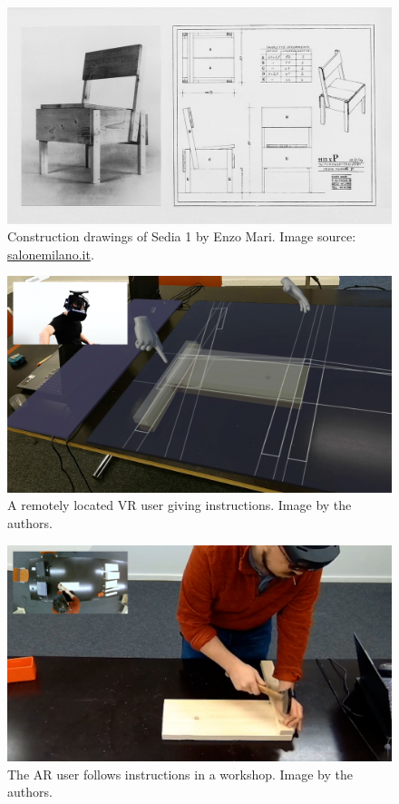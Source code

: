 \documentclass[10pt,twocolumn,letterpaper,english]{article}
\begin{document}
\begin{figure}[!htp]
    \centering
    \includegraphics[width=1\linewidth]{3_Enzo-Mari.jpg}
    \caption{Construction drawings of Sedia 1 by Enzo Mari. Image source: \url{salonemilano.it}.}
    \label{fig:sedia1}
\end{figure}

\begin{figure}[!htp]
    \centering
    \includegraphics[width=1\linewidth]{Pointers.jpg}
    \caption{A remotely located VR user giving instructions. Image by the authors.}
    \label{fig:VR_user}
\end{figure}

\begin{figure}[!htp]
    \centering
    \includegraphics[width=1\linewidth]{Hololens.jpg}
    \caption{The AR user follows instructions in a workshop. Image by the authors.}
    \label{fig:AR_user}
\end{figure}
\end{document}
